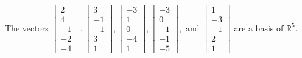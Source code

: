 \begin{exercise}
\begin{exerciseStatement}
  \end{exerciseStatement}
  \begin{exerciseAnswer}
   The vectors \(\left[\begin{array}{r}
2 \\
4 \\
-1 \\
-2 \\
-4
\end{array}\right] , \left[\begin{array}{r}
3 \\
-1 \\
-1 \\
3 \\
1
\end{array}\right] , \left[\begin{array}{r}
-3 \\
1 \\
0 \\
-4 \\
1
\end{array}\right] , \left[\begin{array}{r}
-3 \\
0 \\
-1 \\
-1 \\
-5
\end{array}\right] , \text{ and } \left[\begin{array}{r}
1 \\
-3 \\
-1 \\
2 \\
1
\end{array}\right]\) 
  	 are  a basis of \(\mathbb{R}^5\).
  


  \end{exerciseAnswer}
\end{exercise}